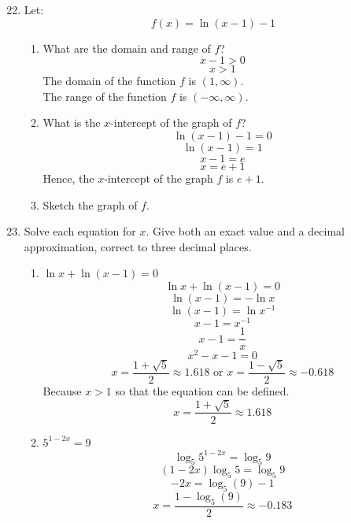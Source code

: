\documentclass[12pt]{article}
\begin{document}
\begin{enumerate}
\setcounter{enumi}{21}
    \item Let:
    \[f(x) = \ln(x-1) - 1\]
    \begin{enumerate}
        \item What are the domain and range of $f$?
        \[x-1 > 0\]
        \[x > 1\]
        The domain of the function $f$ is $(1,\infty)$.\\
        The range of the function $f$ is $(-\infty, \infty)$.
        \item What is the $x$-intercept of the graph of $f$?
        \[\ln(x-1) - 1 = 0\]
        \[\ln(x-1) = 1\]
        \[x-1 = e\]
        \[x = e + 1\]
        Hence, the $x$-intercept of the graph $f$ is $e+1$.
        \item Sketch the graph of $f$.
        \begin{center}
        \end{center}
    \end{enumerate}

\setcounter{enumi}{24}
    \item Solve each equation for $x$. Give both an exact value and a decimal approximation, correct to three decimal places.
    \begin{enumerate}
        \item \(\ln x + \ln (x-1) = 0\)
        \[\ln x + \ln (x-1) = 0\]
        \[\ln (x-1) = - \ln x\]
        \[\ln(x-1) = \ln x^{-1}\]
        \[x - 1 = x^{-1}\]
        \[x - 1 = \frac{1}{x}\]
        \[x^2 - x - 1 = 0\]
        \[x = \frac{1+\sqrt{5}}{2} \approx 1.618 \text{ or } x = \frac{1-\sqrt{5}}{2} \approx -0.618\]
        Because $x > 1$ so that the equation can be defined.
        \[x = \frac{1+\sqrt{5}}{2} \approx 1.618\]
        \item \(5^{1-2x} = 9\)
        \[\log_5 5^{1-2x} = \log_5 9\]
        \[(1-2x)\log_5 5 = \log_5 9\]
        \[-2x = \log_5 (9) - 1 \]
        \[x = \frac{1 - \log_5 (9)}{2} \approx -0.183\]
    \end{enumerate}

\end{enumerate}
\end{document}
